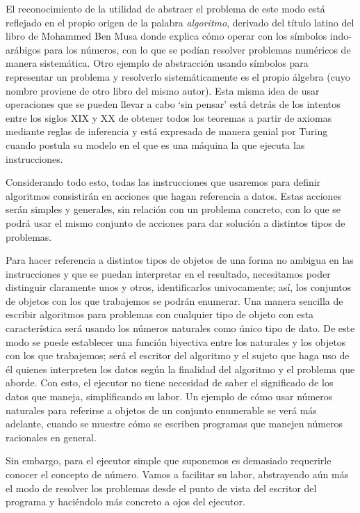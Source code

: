 El reconocimiento de la utilidad de abstraer el problema de este modo está reflejado en el propio
origen de la palabra {\it algoritmo}, derivado del título latino del libro de Mohammed Ben Musa
donde explica cómo operar con los símbolos indo-arábigos para los números, con lo que se podían
resolver problemas numéricos de manera sistemática. Otro ejemplo de abstracción usando símbolos para
re\-presentar un problema y resolverlo sistemáticamente es el propio álgebra (cuyo nombre proviene de
otro libro del mismo autor). Esta misma idea de usar operaciones que se pueden llevar a cabo ‘sin
pensar’ está detrás de los intentos entre los siglos XIX y XX de obtener todos los teoremas a partir
de axiomas mediante reglas de inferencia y está expresada de manera genial por Turing cuando postula
su modelo en el que es una máquina la que ejecuta las instrucciones.

Considerando todo esto, todas las instrucciones que usaremos para definir algoritmos consistirán en
acciones que hagan referencia a datos. Estas acciones serán simples y generales, sin relación con un
problema concreto, con lo que se podrá usar el mismo conjunto de acciones para dar solución a
distintos tipos de problemas.

%
Para hacer referencia a distintos tipos de objetos de una forma no ambigua en las instrucciones y
que se puedan interpretar en el resultado, necesitamos poder distinguir claramente unos y otros,
identificarlos univocamente; así, los conjuntos de objetos con los que trabajemos se podrán
enumerar. Una manera sencilla de escribir algoritmos para problemas con cualquier tipo de objeto con
esta ca\-rac\-terística será usando los números naturales como único tipo de dato. De este modo se puede
establecer una función biyectiva entre los naturales y los objetos con los que trabajemos; será el
escritor del algoritmo y el sujeto que haga uso de él quienes interpreten los datos según la
finalidad del algoritmo y el problema que aborde. Con esto, el ejecutor no tiene necesidad de saber
el significado de los datos que maneja, simplificando su labor. Un ejemplo de cómo usar números
na\-tu\-rales para referirse a objetos de un conjunto enumerable se verá más adelante, cuando se muestre
cómo se escriben programas que manejen números racionales en general.

Sin embargo, para el ejecutor simple que suponemos es demasiado requerirle conocer el concepto de
número. Vamos a facilitar su labor, abstrayendo aún más el modo de resolver los problemas desde el
punto de vista del escritor del programa y haciéndolo más concreto a ojos del ejecutor.

